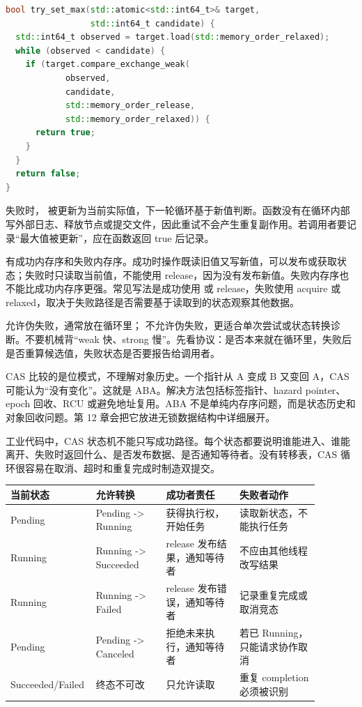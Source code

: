\begin{lstlisting}[language=C++,caption={CAS 循环只在成功后提交外部副作用}]
bool try_set_max(std::atomic<std::int64_t>& target,
                 std::int64_t candidate) {
  std::int64_t observed = target.load(std::memory_order_relaxed);
  while (observed < candidate) {
    if (target.compare_exchange_weak(
            observed,
            candidate,
            std::memory_order_release,
            std::memory_order_relaxed)) {
      return true;
    }
  }
  return false;
}
\end{lstlisting}

失败时， 被更新为当前实际值，下一轮循环基于新值判断。函数没有在循环内部写外部日志、释放节点或提交文件，因此重试不会产生重复副作用。若调用者要记录“最大值被更新”，应在函数返回 true 后记录。

 有成功内存序和失败内存序。成功时操作既读旧值又写新值，可以发布或获取状态；失败时只读取当前值，不能使用 release，因为没有发布新值。失败内存序也不能比成功内存序更强。常见写法是成功使用  或 release，失败使用 acquire 或 relaxed，取决于失败路径是否需要基于读取到的状态观察其他数据。

 允许伪失败，通常放在循环里； 不允许伪失败，更适合单次尝试或状态转换诊断。不要机械背“weak 快、strong 慢”。先看协议：是否本来就在循环里，失败后是否重算候选值，失败状态是否要报告给调用者。

CAS 比较的是位模式，不理解对象历史。一个指针从 A 变成 B 又变回 A，CAS 可能认为“没有变化”。这就是 ABA。解决方法包括标签指针、hazard pointer、epoch 回收、RCU 或避免地址复用。ABA 不是单纯内存序问题，而是状态历史和对象回收问题。第 12 章会把它放进无锁数据结构中详细展开。

工业代码中，CAS 状态机不能只写成功路径。每个状态都要说明谁能进入、谁能离开、失败时返回什么、是否发布数据、是否通知等待者。没有转移表，CAS 循环很容易在取消、超时和重复完成时制造双提交。

\begin{center}
\begin{tabular}{p{0.18\linewidth}p{0.22\linewidth}p{0.23\linewidth}p{0.25\linewidth}}
\toprule
当前状态 & 允许转换 & 成功者责任 & 失败者动作 \\
\midrule
Pending & Pending -> Running & 获得执行权，开始任务 & 读取新状态，不能执行任务 \\
Running & Running -> Succeeded & release 发布结果，通知等待者 & 不应由其他线程改写结果 \\
Running & Running -> Failed & release 发布错误，通知等待者 & 记录重复完成或取消竞态 \\
Pending & Pending -> Canceled & 拒绝未来执行，通知等待者 & 若已 Running，只能请求协作取消 \\
Succeeded/Failed & 终态不可改 & 只允许读取 & 重复 completion 必须被识别 \\
\bottomrule
\end{tabular}
\end{center}


